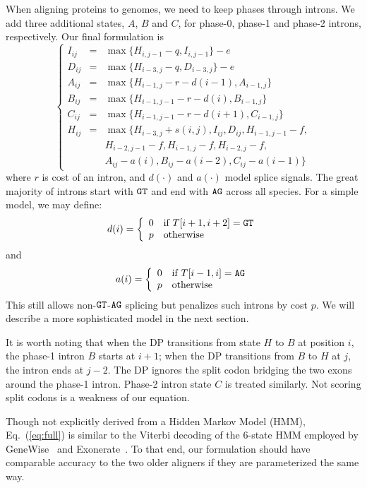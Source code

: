 \documentclass{bioinfo}
\begin{document}
\begin{methods}
When aligning proteins to genomes, we need to keep phases through introns. We
add three additional states, $A$, $B$ and $C$, for phase-0, phase-1 and phase-2
introns, respectively.  Our final formulation is
\begin{equation}\label{eq:full}
\left\{\begin{array}{lll}
I_{ij}&=&\max\{ H_{i,j-1} - q, I_{i,j-1} \} - e \\
D_{ij}&=&\max\{ H_{i-3,j} - q, D_{i-3,j} \} - e \\
A_{ij}&=&\max\{ H_{i-1,j} - r - d(i-1), A_{i-1,j} \} \\
B_{ij}&=&\max\{ H_{i-1,j-1} - r - d(i), B_{i-1,j} \} \\
C_{ij}&=&\max\{ H_{i-1,j-1} - r - d(i+1), C_{i-1,j} \} \\
H_{ij}&=&\max\{ H_{i-3,j}+s(i,j), I_{ij}, D_{ij}, H_{i-1,j-1}-f, \\
       && H_{i-2,j-1}-f, H_{i-1,j}-f, H_{i-2,j}-f, \\
	   && A_{ij}-a(i), B_{ij}-a(i-2), C_{ij}-a(i-1) \}
\end{array}\right.
\end{equation}
where $r$ is cost of an intron, and $d(\cdot)$ and $a(\cdot)$ model splice
signals. The great majority of introns start with ${\tt GT}$ and end with ${\tt
AG}$ across all species. For a simple model, we may define:
$$
d(i)=\left\{\begin{array}{ll}
0 & \mbox{if $T[i+1,i+2]={\tt GT}$}\\
p & \mbox{otherwise}\\
\end{array}\right.
$$
and
$$
a(i)=\left\{\begin{array}{ll}
0 & \mbox{if $T[i-1,i]={\tt AG}$}\\
p & \mbox{otherwise}\\
\end{array}\right.
$$
This still allows non-${\tt GT}$-${\tt AG}$ splicing but penalizes such introns
by cost $p$. We will describe a more sophisticated model in the next section.

It is worth noting that when the DP transitions from state $H$ to $B$ at
position $i$, the phase-1 intron $B$ starts at $i+1$; when the DP
transitions from $B$ to $H$ at $j$, the intron ends at $j-2$. The DP ignores
the split codon bridging the two exons around the phase-1 intron. Phase-2
intron state $C$ is treated similarly. Not scoring split codons is a weakness
of our equation.

Though not explicitly derived from a Hidden Markov Model (HMM),
Eq.~(\ref{eq:full}) is similar to the Viterbi decoding of the 6-state HMM
employed by GeneWise~\citep{Birney:2004uy} and Exonerate~\citep{Slater:2005aa}.
To that end,  our formulation should have comparable accuracy to the two older
aligners if they are parameterized the same way.


\end{methods}
\end{document}
